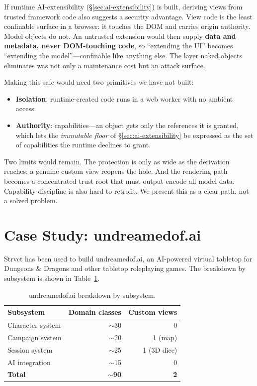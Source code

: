 \documentclass[sigplan,review,anonymous,10pt]{acmart}
\begin{document}
If runtime AI-extensibility (\S\ref{sec:ai-extensibility}) is built, deriving views from trusted framework code also suggests a security advantage. View code is the least confinable surface in a browser: it touches the DOM and carries origin authority. Model objects do not. An untrusted extension would then supply \textbf{data and metadata, never DOM-touching code}, so ``extending the UI'' becomes ``extending the model''---confinable like anything else. The layer naked objects eliminates was not only a maintenance cost but an attack surface.

Making this safe would need two primitives we have not built:

\begin{itemize}
\item \textbf{Isolation}: runtime-created code runs in a web worker with no ambient access.
\item \textbf{Authority}: capabilities---an object gets only the references it is granted, which lets the \emph{immutable floor} of \S\ref{sec:ai-extensibility} be expressed as the set of capabilities the runtime declines to grant.
\end{itemize}

Two limits would remain. The protection is only as wide as the derivation reaches; a genuine custom view reopens the hole. And the rendering path becomes a concentrated trust root that must output-encode all model data. Capability discipline is also hard to retrofit. We present this as a clear path, not a solved problem.

\section{Case Study: undreamedof.ai}
\label{sec:case-study}

Strvct has been used to build undreamedof.ai, an AI-powered virtual tabletop for Dungeons \& Dragons and other tabletop roleplaying games. The breakdown by subsystem is shown in Table~\ref{tab:breakdown}.

\begin{table}[h]
\centering
\begin{tabular}{lrr}
\hline
Subsystem & Domain classes & Custom views \\
\hline
Character system & $\sim$30 & 0 \\
Campaign system & $\sim$20 & 1 (map) \\
Session system & $\sim$25 & 1 (3D dice) \\
AI integration & $\sim$15 & 0 \\
\hline
\textbf{Total} & \textbf{$\sim$90} & \textbf{2} \\
\hline
\end{tabular}
\caption{undreamedof.ai breakdown by subsystem.}
\label{tab:breakdown}
\end{table}
\end{document}
